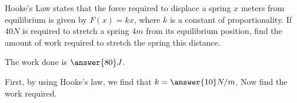 \documentclass{ximera}
\author{Jim Talamo}
\begin{document}
\begin{exercise}

Hooke's Law states that the force required to displace a spring $x$ meters from equilibrium is given by $F(x) = kx$, where $k$ is a constant of proportionality.  If $40 N$ is required to stretch a spring $4 m$ from its equilibrium position, find the amount of work required to stretch the spring this distance.

The work done is $\answer{80} J$.

\begin{hint}
First, by using Hooke's law, we find that $k = \answer{10} N/m$.  Now find the work required.
\end{hint}

\end{exercise}
\end{document}
